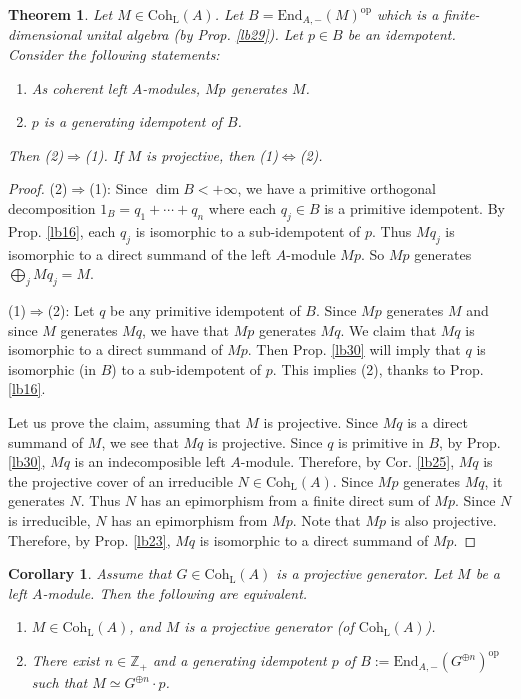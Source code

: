 \documentclass[11pt,b5paper,notitlepage]{article}
\theoremstyle{definition}
\theoremstyle{plain}
\newtheorem{thm}[df]{Theorem}
\newtheorem{co}[df]{Corollary}
\newcommand{\End}{\mathrm{End}} %
\newcommand{\opp}{\mathrm{op}}
\newcommand{\Zbb}{\mathbb Z}
\newcommand{\Coh}{\mathrm{Coh}_{\mathrm L}}
\numberwithin{equation}{section}
\begin{document}
\begin{thm}\label{lb31}
Let $M\in\Coh(A)$. Let $B=\End_{A,-}(M)^\opp$ which is a finite-dimensional unital algebra (by Prop. \ref{lb29}). Let $p\in B$ be an idempotent. Consider the following statements:
\begin{enumerate}[label=(\arabic*)]
\item As coherent left $A$-modules, $Mp$ generates $M$.
\item $p$ is a generating idempotent of $B$.
\end{enumerate}
Then (2)$\Rightarrow$(1). If $M$ is projective, then (1)$\Leftrightarrow$(2). 
\end{thm}



\begin{proof}
(2)$\Rightarrow$(1): Since $\dim B<+\infty$, we have a primitive orthogonal decomposition $1_B=q_1+\cdots+q_n$ where each $q_j\in B$ is a primitive idempotent. By Prop. \ref{lb16}, each $q_j$ is isomorphic to a sub-idempotent of $p$. Thus $Mq_j$ is isomorphic to a direct summand of the left $A$-module $Mp$. So $Mp$ generates $\bigoplus_j Mq_j=M$.


(1)$\Rightarrow$(2): Let $q$ be any primitive idempotent of $B$. Since $Mp$ generates $M$ and since $M$ generates $Mq$, we have that $Mp$ generates $Mq$. We claim that $Mq$ is isomorphic to a direct summand of $Mp$. Then Prop. \ref{lb30} will imply that $q$ is isomorphic (in $B$) to a sub-idempotent of $p$. This implies (2), thanks to Prop. \ref{lb16}.



Let us prove the claim, assuming that $M$ is projective. Since $Mq$ is a direct summand of $M$, we see that $Mq$ is projective. Since $q$ is primitive in $B$, by Prop. \ref{lb30}, $Mq$ is an indecomposible left $A$-module. Therefore, by Cor. \ref{lb25}, $Mq$ is the projective cover of an irreducible $N\in\Coh(A)$. Since $Mp$ generates $Mq$, it generates $N$. Thus $N$ has an epimorphism from a finite direct sum of $Mp$. Since $N$ is irreducible, $N$ has an epimorphism from $Mp$. Note that $Mp$ is also projective. Therefore, by Prop. \ref{lb23}, $Mq$ is isomorphic to a direct summand of $Mp$.
\end{proof}






\begin{co}\label{lb43}
Assume that $G\in\Coh(A)$ is a projective generator. Let $M$ be a left $A$-module. Then the following are equivalent.
\begin{enumerate}[label=(\arabic*)]
\item $M\in\Coh(A)$, and $M$ is a projective generator (of $\Coh(A)$).
\item There exist $n\in\Zbb_+$ and a generating idempotent $p$ of $B:=\End_{A,-}(G^{\oplus n})^\opp$ such that $M\simeq G^{\oplus n}\cdot p$.
\end{enumerate}
\end{co}
\end{document}
